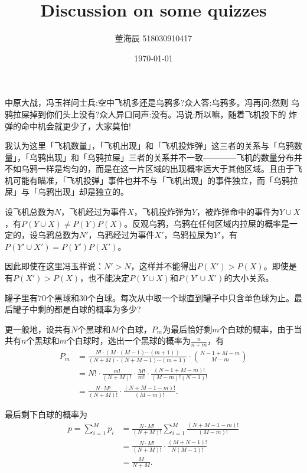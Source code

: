 
% 

\title{Discussion on some quizzes}
\date{\today}
\author{董海辰 518030910417}


\maketitle

\begin{thm}{}{}
    中原大战，冯玉祥问士兵:空中飞机多还是乌鸦多?众人答:乌鸦多。冯再问:然则 乌鸦拉屎掉到你们头上没有?众人异口同声:没有。冯说:所以嘛，随着飞机投下的 炸弹的命中机会就更少了，大家莫怕!
\end{thm}

我认为这里「飞机数量」，「飞机出现」和「飞机投炸弹」这三者的关系与「乌鸦数量」，「乌鸦出现」和「乌鸦拉屎」三者的关系并不一致————飞机的数量分布并不如乌鸦一样是均匀的，而是在这一片区域的出现概率远大于其他区域。且由于飞机可能有瞄准，「飞机投弹」事件也并不与「飞机出现」的事件独立，而「乌鸦拉屎」与「乌鸦出现」却是独立的。

设飞机总数为$N$，飞机经过为事件$X$，飞机投炸弹为$Y$，被炸弹命中的事件为$Y \cup X$，有$P(Y \cup X) \neq P(Y) P(X)$。反观乌鸦，乌鸦在任何区域内拉屎的概率是一定的，设乌鸦总数为$N'$，乌鸦经过为事件$X'$，乌鸦拉屎为$Y'$，有$P(Y' \cup  X') = P(Y') P(X')$。

因此即使在这里冯玉祥说：$N' > N$，这样并不能得出$P(X') > P(X)$。即使是有$P(X') > P(X)$，也不能决定$P(Y \cup X)$和$P(Y' \cup X')$的大小关系。

\begin{thm}{}{}
    罐子里有$70$个黑球和$30$个白球。每次从中取一个球直到罐子中只含单色球为止。最后罐子中剩的都是白球的概率为多少?
\end{thm}

更一般地，设共有$N$个黑球和$M$个白球，$P_m$为最后恰好剩$m$个白球的概率，由于当共有$n$个黑球和$m$个白球时，选出一个黑球的概率为$\frac{n}{n+m}$，有
\begin{align*}
    P_m &= \frac{N! \cdot (M \cdot (M-1) \cdots (m+1))}{(N+M) \cdot (N+M-1) \cdots (m+1)} \cdot \binom {N-1+M-m} {M-m} \\
        &= N! \cdot \frac{m!}{(N+M)!} \cdot \frac{M!}{m!} \cdot \frac{(N-1+M-m)!}{(M-m)!(N-1)!}\\
        &= \frac{N \cdot M!}{(N+M)!}\cdot \frac{(N+M-1-m)!}{(M-m)!}
.\end{align*}

最后剩下白球的概率为
\begin{align*}
    p = \sum_{i=1}^{M} p_i &= \frac{N \cdot M!}{(N+M)!} \sum_{i=1}^{M} \frac{(N+M-1-m)!}{(M-m)!} \\
                           &= \frac{N \cdot M!}{(N+M)!} \cdot \frac{(M+N-1)!}{N (M-1)!} \\
                           &= \frac{M}{N + M}
.\end{align*}

